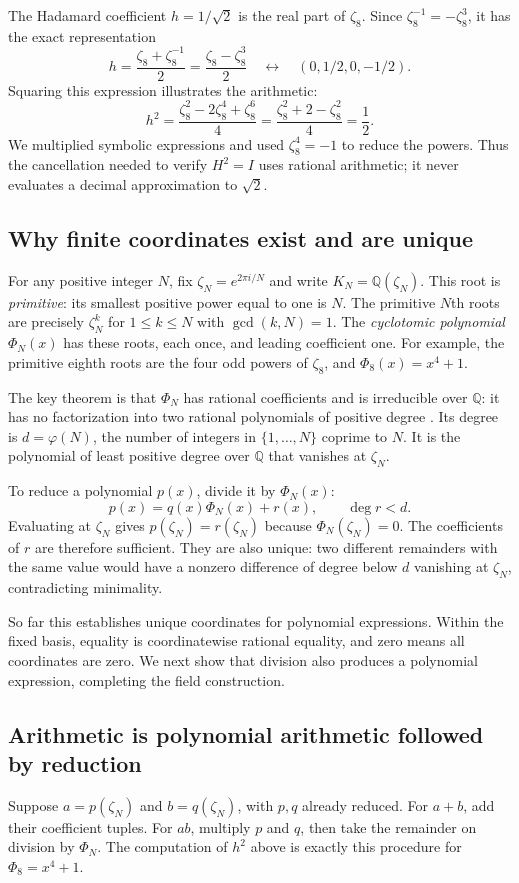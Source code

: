 \documentclass[11pt,a4paper]{article}
\newcommand{\Q}{\mathbb{Q}}
\begin{document}
The Hadamard coefficient $h=1/\sqrt2$ is the real part of $\zeta_8$.
Since $\zeta_8^{-1}=-\zeta_8^3$, it has the exact representation
\[
h=\frac{\zeta_8+\zeta_8^{-1}}2
  =\frac{\zeta_8-\zeta_8^3}{2}
\quad\longleftrightarrow\quad (0,1/2,0,-1/2).
\]
Squaring this expression illustrates the arithmetic:
\[
h^2
=\frac{\zeta_8^2-2\zeta_8^4+\zeta_8^6}{4}
=\frac{\zeta_8^2+2-\zeta_8^2}{4}
=\frac12.
\]
We multiplied symbolic expressions and used $\zeta_8^4=-1$ to reduce
the powers. Thus the cancellation needed to verify $H^2=I$ uses rational
arithmetic; it never evaluates a decimal approximation to $\sqrt2$.

\subsection{Why finite coordinates exist and are unique}
For any positive integer $N$, fix $\zeta_N=e^{2\pi i/N}$ and write
$K_N=\Q(\zeta_N)$. This root is \emph{primitive}: its smallest positive
power equal to one is $N$. The primitive $N$th roots are precisely
$\zeta_N^k$ for $1\le k\le N$ with $\gcd(k,N)=1$.
The \emph{cyclotomic polynomial} $\Phi_N(x)$ has these roots, each once,
and leading coefficient one. For example, the primitive eighth roots
are the four odd powers of $\zeta_8$, and $\Phi_8(x)=x^4+1$.

The key theorem is that $\Phi_N$ has rational coefficients and is
irreducible over $\Q$: it has no factorization into two rational
polynomials of positive degree \cite{milne}. Its degree is
$d=\varphi(N)$, the number of integers in $\{1,\ldots,N\}$ coprime to $N$.
It is the polynomial of least positive degree over $\Q$ that vanishes
at $\zeta_N$.

To reduce a polynomial $p(x)$, divide it by $\Phi_N(x)$:
\[
p(x)=q(x)\Phi_N(x)+r(x),\qquad \deg r<d.
\]
Evaluating at $\zeta_N$ gives $p(\zeta_N)=r(\zeta_N)$ because
$\Phi_N(\zeta_N)=0$. The coefficients of $r$ are therefore sufficient.
They are also unique: two different remainders with the same value
would have a nonzero difference of degree below $d$ vanishing at
$\zeta_N$, contradicting minimality.

So far this establishes unique coordinates for polynomial expressions.
Within the fixed basis, equality is coordinatewise rational equality,
and zero means all coordinates are zero. We next show that division
also produces a polynomial expression, completing the field construction.

\subsection{Arithmetic is polynomial arithmetic followed by reduction}
Suppose $a=p(\zeta_N)$ and $b=q(\zeta_N)$, with $p,q$ already reduced.
For $a+b$, add their coefficient tuples. For $ab$, multiply $p$ and $q$,
then take the remainder on division by $\Phi_N$. The computation of
$h^2$ above is exactly this procedure for $\Phi_8=x^4+1$.
\end{document}
